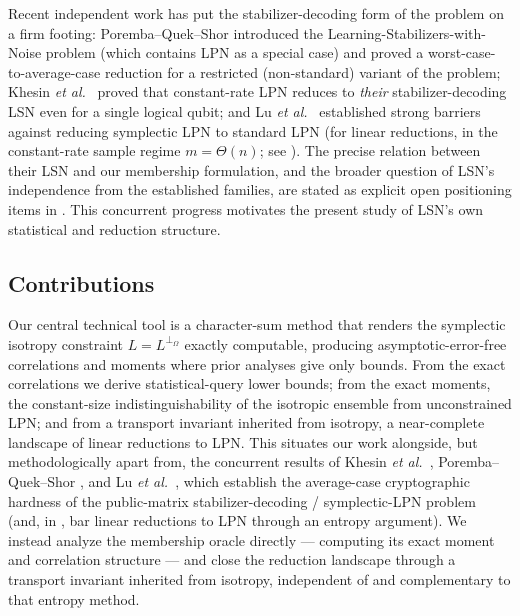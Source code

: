 \documentclass[11pt,a4paper]{article}
\theoremstyle{plain}
\theoremstyle{definition}
\newcommand{\etal}{\textit{et al.}}
\begin{document}
Recent independent work has put the stabilizer-decoding form of the problem on a firm footing: Poremba--Quek--Shor \cite{PQS26} introduced the Learning-Stabilizers-with-Noise problem (which contains LPN as a special case) and proved a worst-case-to-average-case reduction for a restricted (non-standard) variant of the problem; Khesin \etal\ \cite{KLP+25} proved that constant-rate LPN reduces to \emph{their} stabilizer-decoding LSN even for a single logical qubit; and Lu \etal\ \cite{LPQR26} established strong barriers against reducing symplectic LPN to standard LPN (for linear reductions, in the constant-rate sample regime $m=\Theta(n)$; see ). The precise relation between their LSN and our membership formulation, and the broader question of LSN's independence from the established families, are stated as explicit open positioning items in . This concurrent progress motivates the present study of LSN's own statistical and reduction structure.

\subsection{Contributions}
\label{subsec:contributions}

Our central technical tool is a character-sum method that renders the symplectic isotropy constraint $L = L^{\perp_\Omega}$ exactly computable, producing asymptotic-error-free correlations and moments where prior analyses give only bounds. From the exact correlations we derive statistical-query lower bounds; from the exact moments, the constant-size indistinguishability of the isotropic ensemble from unconstrained LPN; and from a transport invariant inherited from isotropy, a near-complete landscape of linear reductions to LPN. This situates our work alongside, but methodologically apart from, the concurrent results of Khesin \etal\ \cite{KLP+25}, Poremba--Quek--Shor \cite{PQS26}, and Lu \etal\ \cite{LPQR26}, which establish the average-case cryptographic hardness of the public-matrix stabilizer-decoding / symplectic-LPN problem (and, in \cite{LPQR26}, bar linear reductions to LPN through an entropy argument). We instead analyze the membership oracle directly --- computing its exact moment and correlation structure --- and close the reduction landscape through a transport invariant inherited from isotropy, independent of and complementary to that entropy method.
\end{document}
